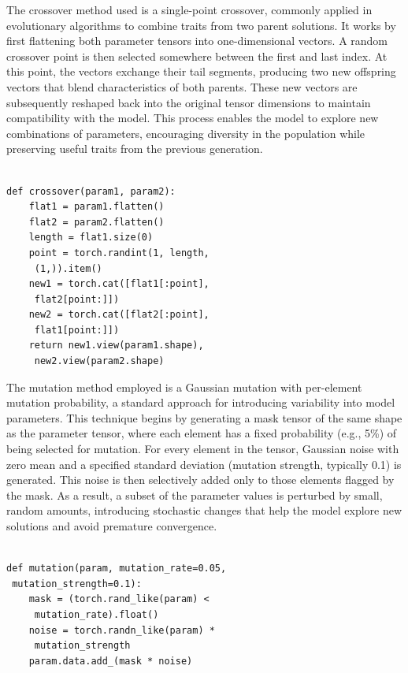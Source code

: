 \documentclass[conference]{IEEEtran}
\begin{document}
\noindent
The crossover method used is a single-point crossover, commonly applied in evolutionary algorithms to combine traits from two parent solutions. It works by first flattening both parameter tensors into one-dimensional vectors. A random crossover point is then selected somewhere between the first and last index. At this point, the vectors exchange their tail segments, producing two new offspring vectors that blend characteristics of both parents. These new vectors are subsequently reshaped back into the original tensor dimensions to maintain compatibility with the model. This process enables the model to explore new combinations of parameters, encouraging diversity in the population while preserving useful traits from the previous generation.\\

{\small
\begin{verbatim}

def crossover(param1, param2):
    flat1 = param1.flatten()
    flat2 = param2.flatten()
    length = flat1.size(0)
    point = torch.randint(1, length,
     (1,)).item()
    new1 = torch.cat([flat1[:point],
     flat2[point:]])
    new2 = torch.cat([flat2[:point],
     flat1[point:]])
    return new1.view(param1.shape),
     new2.view(param2.shape)

\end{verbatim}}


\noindent
The mutation method employed is a Gaussian mutation with per-element mutation probability, a standard approach for introducing variability into model parameters. This technique begins by generating a mask tensor of the same shape as the parameter tensor, where each element has a fixed probability (e.g., 5\%) of being selected for mutation. For every element in the tensor, Gaussian noise with zero mean and a specified standard deviation (mutation strength, typically 0.1) is generated. This noise is then selectively added only to those elements flagged by the mask. As a result, a subset of the parameter values is perturbed by small, random amounts, introducing stochastic changes that help the model explore new solutions and avoid premature convergence.\\

{\small
\begin{verbatim}

def mutation(param, mutation_rate=0.05,
 mutation_strength=0.1):
    mask = (torch.rand_like(param) <
     mutation_rate).float()
    noise = torch.randn_like(param) *
     mutation_strength
    param.data.add_(mask * noise)

\end{verbatim}}
\end{document}
